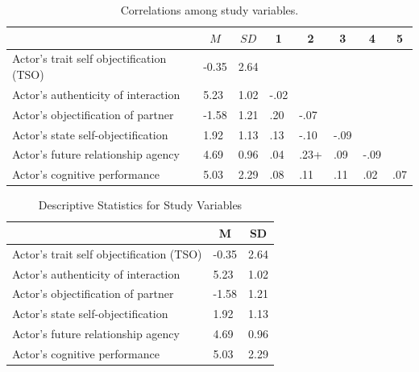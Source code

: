 \documentclass[man]{apa6}
\begin{document}
\begin{table}[tbp]
\begin{center}
\begin{threeparttable}
\caption{\label{tab:corrtable}Correlations among study variables.}
\begin{tabular}{llllllll}
\toprule
 & \multicolumn{1}{c}{$M$} & \multicolumn{1}{c}{$SD$} & \multicolumn{1}{c}{1} & \multicolumn{1}{c}{2} & \multicolumn{1}{c}{3} & \multicolumn{1}{c}{4} & \multicolumn{1}{c}{5}\\
\midrule
Actor's trait self objectification (TSO) & -0.35 & 2.64 &  &  &  &  & \\
Actor's authenticity of interaction & 5.23 & 1.02 & -.02 &  &  &  & \\
Actor's objectification of partner & -1.58 & 1.21 & .20 & -.07 &  &  & \\
Actor's state self-objectification & 1.92 & 1.13 & .13 & -.10 & -.09 &  & \\
Actor's future relationship agency & 4.69 & 0.96 & .04 & .23+ & .09 & -.09 & \\
Actor's cognitive performance & 5.03 & 2.29 & .08 & .11 & .11 & .02 & .07\\
\bottomrule
\end{tabular}
\end{threeparttable}
\end{center}
\end{table}

\begin{table}[tbp]
\begin{center}
\begin{threeparttable}
\caption{\label{tab:descriptives}Descriptive Statistics for Study Variables}
\begin{tabular}{lll}
\toprule
 & \multicolumn{1}{c}{M} & \multicolumn{1}{c}{SD}\\
\midrule
Actor's trait self objectification (TSO) & -0.35 & 2.64\\
Actor's authenticity of interaction & 5.23 & 1.02\\
Actor's objectification of partner & -1.58 & 1.21\\
Actor's state self-objectification & 1.92 & 1.13\\
Actor's future relationship agency & 4.69 & 0.96\\
Actor's cognitive performance & 5.03 & 2.29\\
\bottomrule
\end{tabular}
\end{threeparttable}
\end{center}
\end{table}
\end{document}
